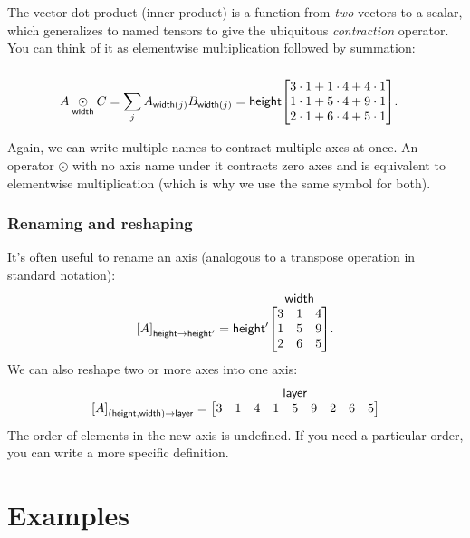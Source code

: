 \documentclass{article}
\makeatletter
\newcommand{\nmatrix}[3]{\name{#1}\begin{array}[b]{@{}c@{}}\name{#2}\\\begin{bmatrix}#3\end{bmatrix}\end{array}}
\makeatother
\begin{document}
The vector dot product (inner product) is a function from \emph{two} vectors to a scalar, which generalizes to named tensors to give the ubiquitous \emph{contraction} operator. You can think of it as elementwise multiplication followed by summation:
\begin{align*}
A \ndot{width} C &= \sum_j A_{\nidx{width}{j}} B_{\nidx{width}{j}} = \nmatrix{height}{}{
  3\cdot1 + 1\cdot4 + 4\cdot1 \\
  1\cdot1 + 5\cdot4 + 9\cdot1 \\
  2\cdot1 + 6\cdot4 + 5\cdot1
}.
\end{align*}

Again, we can write multiple names to contract multiple axes at once. An operator $\odot$ with no axis name under it contracts zero axes and is equivalent to elementwise multiplication (which is why we use the same symbol for both).

\subsubsection{Renaming and reshaping}

It's often useful to rename an axis (analogous to a transpose operation in standard notation):
\begin{equation*}
\nmov{height}{height'}{A} = \nmatrix{height'}{width}{
  3 & 1 & 4 \\
  1 & 5 & 9 \\
  2 & 6 & 5 \\
}.
\end{equation*}
We can also reshape two or more axes into one axis:
\begin{equation*}
  \nmov{(height,width)}{layer}{A} = \nmatrix{}{layer}{
    3 & 1 & 4 & 1 & 5 & 9 & 2 & 6 & 5
  }
\end{equation*}
The order of elements in the new axis is undefined. If you need a particular order, you can write a more specific definition.

\section{Examples}
\label{sec:examples}
\end{document}
